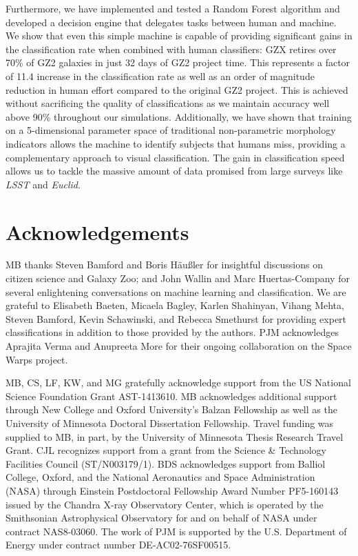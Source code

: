Furthermore, we have implemented and tested a Random Forest algorithm 
and developed a decision engine that delegates tasks between human and 
machine.  We show that even this simple machine is capable of providing significant 
gains in the classification rate when combined with human classifiers: GZX
 retires over 70\% of GZ2 galaxies in just 32 days of GZ2 project time.  
This represents a factor of 11.4 increase in the classification rate as well as
 an order of magnitude reduction in human effort compared to the original GZ2 project. 
This is achieved without sacrificing the quality of classifications as we maintain 
accuracy well above 90\% throughout our simulations. 
Additionally, we have shown that training on a 5-dimensional parameter space of 
traditional non-parametric morphology indicators allows the machine to identify 
subjects that humans miss, providing  a complementary approach to visual classification. 
The gain in classification speed allows us to tackle the massive amount of data promised
 from large surveys like \textit{LSST} and \textit{Euclid}.
 
 
\section{Acknowledgements}
MB thanks Steven Bamford and Boris H{\"a}u{\ss}ler for insightful discussions on citizen science and Galaxy Zoo; and John Wallin and Marc Huertas-Company for several enlightening conversations on machine learning and classification. 
We are grateful to Elisabeth Baeten, Micaela Bagley, Karlen Shahinyan, Vihang Mehta, Steven Bamford, Kevin Schawinski, and Rebecca Smethurst for providing expert classifications in addition to those provided by the authors. PJM acknowledges Aprajita Verma and Anupreeta More for their ongoing collaboration on the Space Warps project. 

MB, CS, LF, KW, and MG gratefully acknowledge support from the US National Science
Foundation Grant AST-1413610.  MB acknowledges additional support 
through New College and Oxford University's Balzan Fellowship as well as the University
of Minnesota Doctoral Dissertation Fellowship. Travel funding was supplied 
to MB, in part, by the University of Minnesota Thesis Research Travel Grant. CJL recognizes support from a grant from the Science \& Technology Facilities Council (ST/N003179/1). 
BDS acknowledges support from Balliol College, Oxford, and the National Aeronautics and Space Administration (NASA) through Einstein Postdoctoral Fellowship Award Number PF5-160143 issued by the Chandra X-ray Observatory Center, which is operated by the Smithsonian Astrophysical Observatory for and on behalf of NASA under contract NAS8-03060. The work of PJM is supported by the U.S. Department of Energy under contract number DE-AC02-76SF00515.




